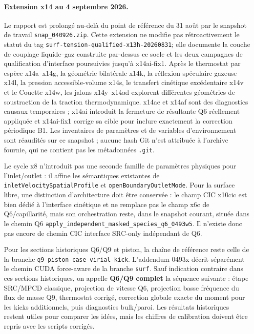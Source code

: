 \documentclass[11pt,a4paper]{article}
\begin{document}
\paragraph{Extension x14 au 4 septembre 2026.}
Le rapport est prolongé au-delà du point de référence du 31 août par le snapshot de travail \nolinkurl{snap_040926.zip}. Cette extension ne modifie pas rétroactivement le statut du tag \nolinkurl{surf-tension-qualified-x13h-20260831}; elle documente la couche de couplage liquide--gaz construite par-dessus ce socle et les deux campagnes de qualification d'interface poursuivies jusqu'à x14ai-fix1. Après le thermostat par espèce x14a--x14g, la géométrie bilatérale x14k, la réflexion spéculaire gazeuse x14l, la pression accessible-volume x14s, le transfert cinétique excédentaire x14v et le Couette x14w, les jalons x14y--x14ad explorent différentes géométries de soustraction de la traction thermodynamique. x14ae et x14af sont des diagnostics causaux temporaires ; x14ai introduit la fermeture de résultante Q6 réellement appliquée et x14ai-fix1 corrige sa cible pour inclure exactement la correction périodique B1. Les inventaires de paramètres et de variables d'environnement sont réaudités sur ce snapshot ; aucune hash Git n'est attribuée à l'archive fournie, qui ne contient pas les métadonnées \texttt{.git}.


Le cycle x8 n'introduit pas une seconde famille de paramètres physiques pour l'inlet/outlet : il affine les sémantiques existantes de \texttt{inletVelocitySpatialProfile} et \texttt{openBoundaryOutletMode}. Pour la surface libre, une distinction d'architecture doit être conservée : le champ CIC x10cic est bien dédié à l'interface cinétique et ne remplace pas le champ x6c de Q6/capillarité, mais son orchestration reste, dans le snapshot courant, située dans le chemin Q6 \texttt{apply\_independent\_masked\_species\_q6\_0493w5}. Il n'existe donc pas encore de chemin CIC interface SRC-only indépendant de Q6.


Pour les sections historiques Q6/Q9 et piston, la chaîne de référence reste celle de la branche \texttt{q9-piston-case-virial-kick}. L'addendum 0493x décrit séparément le chemin CUDA force-aware de la branche \texttt{surf}. Sauf indication contraire dans ces sections historiques, on appelle \textbf{Q6/Q9 complet} la séquence suivante : étape SRC/MPCD classique, projection de vitesse Q6, projection basse fréquence du flux de masse Q9, thermostat corrigé, correction globale exacte du moment pour les kicks additionnels, puis diagnostics bulk/paroi. Les résultats historiques restent utiles pour comparer les idées, mais les chiffres de calibration doivent être repris avec les scripts corrigés.
\end{document}
